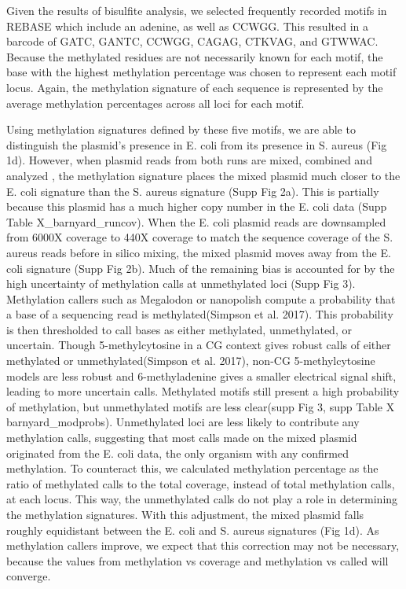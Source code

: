 Given the results of bisulfite analysis, we selected frequently recorded motifs in REBASE which include an adenine, as well as CCWGG. This resulted in a barcode of GATC, GANTC, CCWGG, CAGAG, CTKVAG, and GTWWAC. Because the methylated residues are not necessarily known for each motif, the base with the highest methylation percentage was chosen to represent each motif  locus. Again, the methylation signature of each sequence is represented by the average methylation percentages across all loci for each motif.

Using methylation signatures defined by these five motifs, we are able to distinguish the plasmid’s presence in E. coli from its presence in S. aureus (Fig 1d). However, when plasmid reads from both runs are mixed, combined and analyzed , the methylation signature places the mixed plasmid much closer to the E. coli signature than the S. aureus signature (Supp Fig 2a). This is partially because this plasmid has a much higher copy number in the E. coli data (Supp Table X_barnyard_runcov). When the E. coli plasmid reads are downsampled from 6000X coverage to 440X coverage to match the sequence coverage of the S. aureus reads before in silico mixing, the mixed plasmid moves away from the E. coli signature (Supp Fig 2b). Much of the remaining bias is accounted for by the high uncertainty of methylation calls at unmethylated loci (Supp Fig 3). Methylation callers such as Megalodon or nanopolish compute a probability that a base of a sequencing read is methylated(Simpson et al. 2017). This probability is then thresholded to call bases as either methylated, unmethylated, or uncertain. Though 5-methylcytosine in a CG context gives robust calls of either methylated or unmethylated(Simpson et al. 2017), non-CG 5-methylcytosine models are less robust and 6-methyladenine gives a smaller electrical signal shift, leading to more uncertain calls. Methylated motifs still present a high probability of methylation, but unmethylated motifs are less clear(supp Fig 3, supp Table X barnyard_modprobs). Unmethylated loci are less likely to contribute any methylation calls, suggesting that most calls made on the mixed plasmid originated from the E. coli data, the only organism with any confirmed methylation. To counteract this, we calculated methylation percentage as the ratio of methylated calls to the total coverage, instead of total methylation calls, at each locus. This way, the unmethylated calls do not play a role in determining the methylation signatures. With this adjustment, the mixed plasmid falls roughly equidistant between the E. coli and S. aureus signatures (Fig 1d). As methylation callers improve, we expect that this correction may not be necessary, because the values from methylation vs coverage and methylation vs called will converge.

